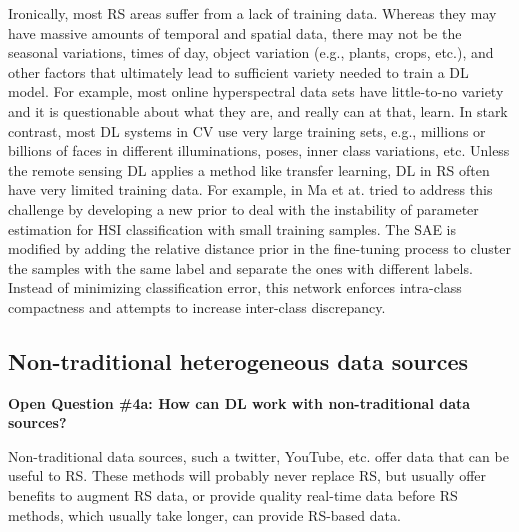 \documentclass[12pt]{spieman}
\begin{document}
\begin{spacing}{1}
Ironically, most RS areas suffer from a lack of training data. Whereas they may have massive amounts of temporal and spatial data, there may not be the seasonal variations, times of day, object variation (e.g., plants, crops, etc.), and other factors that ultimately lead to sufficient variety needed to train a DL model. For example, most online hyperspectral data sets have little-to-no variety and it is questionable about what they are, and really can at that, learn. In stark contrast, most DL systems in CV use very large training sets, e.g., millions or billions of faces in different illuminations, poses, inner class variations, etc. Unless the remote sensing DL applies a method like transfer learning, DL in RS often have very limited training data. For example, in \cite{ma2016hyperspectral} Ma et at. tried to address this challenge by developing a new prior to deal with the instability of parameter estimation for HSI classification with small training samples. The SAE is modified by adding the relative distance prior in the fine-tuning process to cluster the samples with the same label and separate the ones with different labels. Instead of minimizing classification error, this network enforces intra-class compactness and attempts to increase inter-class discrepancy.

%
%
\subsection{Non-traditional heterogeneous data sources}
\label{subsec:ChallengesOpportunities_iv} \textbf{Open Question \#4a: How can DL work with non-traditional data sources?}

Non-traditional data sources, such a twitter, YouTube, etc. offer data that can be useful to RS. These methods will probably never replace RS, but usually offer benefits to augment RS data, or provide quality real-time data before RS methods, which usually take longer, can provide RS-based data.


\end{spacing}
\end{document}
